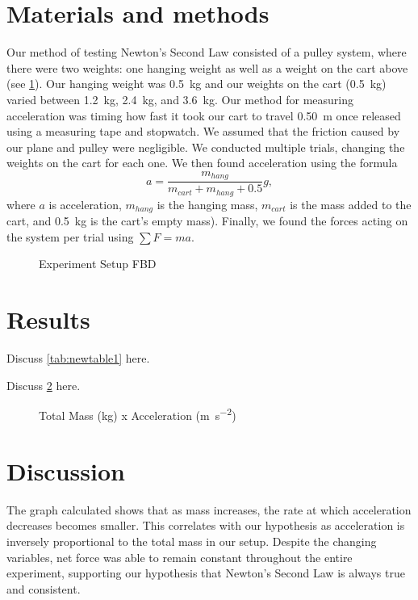 ﻿\documentclass[reprint,amsmath,amssymb,aps]{revtex4-2}
\begin{document}
\section{Materials and methods}
Our method of testing Newton’s Second Law consisted of a pulley system, where there were two weights: one hanging weight as well as a weight on the cart above (see \cref{fig:1}). Our hanging weight was \qty{0.5}{\kilo\gram} and our weights on the cart (\qty{0.5}{\kilo\gram}) varied between \qty{1.2}{\kilo\gram}, \qty{2.4}{\kilo\gram}, and \qty{3.6}{\kilo\gram}. Our method for measuring acceleration was timing how fast it took our cart to travel \qty{0.50}{\meter} once released using a measuring tape and stopwatch. We assumed that the friction caused by our plane and pulley were negligible. We conducted multiple trials, changing the weights on the cart for each one. We then found acceleration using the formula
\begin{equation}
a = \dfrac{m_{hang}}{m_{cart}+m_{hang}+0.5} g,
\end{equation}
where $a$ is acceleration, $m_{hang}$ is the hanging mass, $m_{cart}$ is the mass added to the cart, and \qty{0.5}{\kilo\gram} is the cart's empty mass). Finally, we found the forces acting on the system per trial using $\sum F = ma$.

\begin{figure}
\caption{Experiment Setup FBD}
\label{fig:1}
\end{figure}


\section{Results}
Discuss \cref{tab:newtable1} here. 

%	
%

Discuss \cref{fig:2} here. 
\begin{figure}
\begin{center}

\end{center}
\caption{Total Mass (\unit{\kilo\gram}) x Acceleration (\unit{\meter\per\second\squared})}
\label{fig:2}
\end{figure}


\section{Discussion}
The graph calculated shows that as mass increases, the rate at which acceleration decreases becomes smaller. This correlates with our hypothesis as acceleration is inversely proportional to the total mass in our setup. Despite the changing variables, net force was able to remain constant throughout the entire experiment, supporting our hypothesis that Newton’s Second Law is always true and consistent. 
\end{document}
